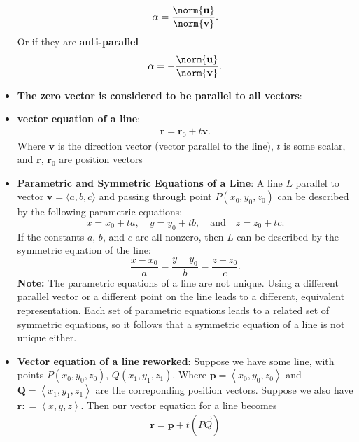 \documentclass{report}
\begin{document}
\begin{itemize}
            \begin{align*}
                \alpha = \frac{\norm{\mathbf{u}}}{\norm{\mathbf{v}}}
            .\end{align*}
            Or if they are \textbf{anti-parallel}
            \begin{align*}
                \alpha = -\frac{\norm{\mathbf{u}}}{\norm{\mathbf{v}}}
            .\end{align*}
        \item \textbf{The zero vector is considered to be parallel to all vectors}:
        \item \textbf{vector equation of a line}:
            \begin{align*}
                \mathbf{r} = \mathbf{r}_{0} + t\mathbf{v} 
            .\end{align*}
            Where $\mathbf{v}$ is the direction vector (vector parallel to the line), $t$ is some scalar, and $\mathbf{r}$, $\mathbf{r}_{0}$ are position vectors
        \item \textbf{Parametric and Symmetric Equations of a Line}:
            A line $L$ parallel to vector $\mathbf{v}=\langle a,b,c \rangle$ and passing through point $P(x_0,y_0,z_0)$ can be described by the following parametric equations:
            \[
                x=x_0+ta, \quad y=y_0+tb, \quad \text{and} \quad z=z_0+tc.
            \]
            If the constants $a$, $b$, and $c$ are all nonzero, then $L$ can be described by the symmetric equation of the line:
            \[
                \frac{x-x_0}{a} = \frac{y-y_0}{b} = \frac{z-z_0}{c}.
            \]
            \bigbreak \noindent 
            \textbf{Note:} The parametric equations of a line are not unique. Using a different parallel vector or a different point on the line leads to a different, equivalent representation. Each set of parametric equations leads to a related set of symmetric equations, so it follows that a symmetric equation of a line is not unique either.
        \item \textbf{Vector equation of a line reworked}: Suppose we have some line, with points $P(x_{0}, y_{0}, z_{0})$, $Q(x_{1}, y_{1}, z_{1})$. Where $\mathbf{p} = \left\langle x_{0}, y_{0}, z_{0}\right\rangle $ and $\mathbf{Q} = \left\langle x_{1}, y_{1}, z_{1}\right\rangle $ are the correponding position vectors. Suppose we also have $\mathbf{r}: = \left\langle x,y,z \right\rangle $. Then our vector equation for a line becomes 
            \begin{align*}
                \mathbf{r} = \mathbf{p} + t\left(\vec{PQ}\right)

\end{align*}
\end{itemize}
\end{document}
